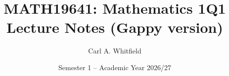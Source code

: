 \documentclass[11pt]{article}
\numberwithin{equation}{subsection}
\numberwithin{figure}{section}
\theoremstyle{definition}
\newcommand{\newtexpage}{}
\newcommand{\newtexpage}{\newpage}
\newcommand{\titlesuffix}{(Gappy version)}
\newcommand{\titlesuffix}{(Completed version)}
\begin{document}
\title{MATH19641: Mathematics 1Q1 Lecture Notes \titlesuffix}
\author{Carl A. Whitfield}
\date{Semester 1 -- Academic Year 2026/27}


\newtexpage

\newtexpage

\newtexpage

\newtexpage

\newtexpage

\newtexpage

\end{document}
